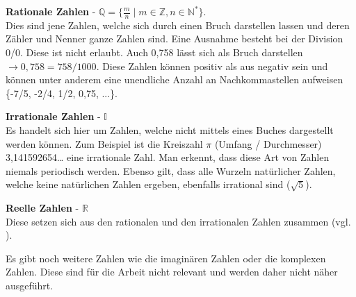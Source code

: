 \documentclass[german,12pt,a4paper]{article}
\begin{document}
\textbf{Rationale Zahlen} - $\mathbb{Q} = \{\frac{m}{n} \mid m \in \mathbb{Z}, n \in \mathbb{N}^*\}$.\\
Dies sind jene Zahlen, welche sich durch einen Bruch darstellen lassen und deren Zähler und Nenner ganze Zahlen sind.
Eine Ausnahme besteht bei der Division 0/0.
Diese ist nicht erlaubt.
Auch 0,758 lässt sich als Bruch darstellen $\rightarrow{0,758 = 758/1000}$.
Diese Zahlen können positiv als aus negativ sein und können unter anderem eine unendliche Anzahl an Nachkommastellen aufweisen \{-7/5, -2/4, 1/2, 0,75, ...\}.

\textbf{Irrationale Zahlen} - $\mathbb{I}$\\
Es handelt sich hier um Zahlen, welche nicht mittels eines Buches dargestellt werden können.
Zum Beispiel ist die Kreiszahl $\pi$ (Umfang / Durchmesser) 3,141592654… eine irrationale Zahl.
Man erkennt, dass diese Art von Zahlen niemals periodisch werden.
Ebenso gilt, dass alle Wurzeln natürlicher Zahlen, welche keine natürlichen Zahlen ergeben, ebenfalls irrational sind ($\sqrt{5}$).

\textbf{Reelle Zahlen} - $\mathbb{R}$\\
Diese setzen sich aus den rationalen und den irrationalen Zahlen zusammen (vgl. \cite[7--9]{Engel2017}).

Es gibt noch weitere Zahlen wie die imaginären Zahlen oder die komplexen Zahlen.
Diese sind für die Arbeit nicht relevant und werden daher nicht näher ausgeführt.
\end{document}
